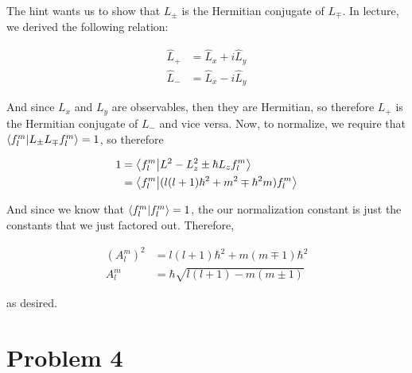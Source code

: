 \documentclass[10pt]{article}
\begin{document}
    \begin{solution}
        The hint wants us to show that $L_{\pm}$ is the Hermitian conjugate of $L_{\mp}$. In lecture, we derived the following relation: 

        \begin{align*}
            \hat L_+ &= \hat L_x + i\hat L_y\\
            \hat L_- &= \hat L_x - i \hat L_y
        \end{align*}

        And since $L_x$ and $L_y$ are observables, then they are Hermitian, so therefore $L_+$ is the Hermitian conjugate of $L_-$ and vice versa. Now, to normalize, we require that $\braket{f_l^m}{L_\pm L_\mp f_l^m} = 1$, so therefore

        \begin{align*}
            1 &= \braket{f_l^m}{L^2 - L_z^2 \pm \hbar L_z f_l^m}\\
            &= \braket{f_l^m}{(l(l+1)\hbar^2 + m^2 \mp \hbar^2 m)f_l^m}
        \end{align*}

        And since we know that $\braket{f_l^m}{f_l^m} = 1$, the our normalization constant is just the constants that we just factored out. Therefore, 

        \begin{align*}
            (A_l^m)^2 &= l(l+1)\hbar^2 + m(m \mp 1)\hbar^2\\
            A_l^m &= \hbar \sqrt{l(l+1) - m(m \pm 1)}
        \end{align*}

        as desired.
    \end{solution}

    \pagebreak
    \section*{Problem 4}
\end{document}
